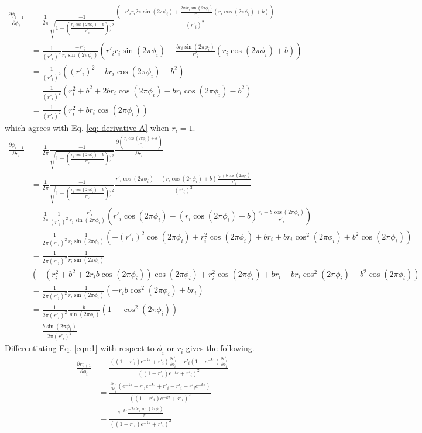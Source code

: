 \begin{align*}
   \frac{\partial \phi_{i+1}}{\partial \phi_i} & = \frac{1}{2\pi}\frac{-1}{\sqrt{1-(\frac{r_i\cos(2\pi\phi_i)+b}{r'_i}))^2}}  \frac{(-r'_ir_i2\pi\sin(2\pi\phi_i)+\frac{2\pi br_i\sin(2\pi\phi_i)}{r'_i}(r_i\cos(2\pi\phi_i)+b))}{(r'_i)^2}\\
   & = \frac{1}{(r'_i)^2}\frac{-r'_i}{r_i\sin(2\pi\phi_i)}   (r'_ir_i\sin(2\pi\phi_i)-\frac{br_i\sin(2\pi\phi_i)}{r'_i}(r_i\cos(2\pi\phi_i)+b))\\
   & = \frac{1}{(r'_i)^2}((r'_i)^2-br_i\cos(2\pi\phi_i)-b^2)\\
   & = \frac{1}{(r'_i)^2}(r_i^2+b^2+2br_i\cos(2\pi\phi_i)-br_i\cos(2\pi\phi_i)-b^2)\\
   & = \frac{1}{(r'_i)^2}(r_i^2+br_i\cos(2\pi\phi_i))
\end{align*}
which agrees with Eq. \ref{eq: derivative A} when $r_i=1$.
\begin{align*}
   \frac{\partial \phi_{i+1}}{\partial r_i} & = \frac{1}{2\pi}\frac{-1}{\sqrt{1-(\frac{r_i\cos(2\pi\phi_i)+b}{r'_i}))^2}}\frac{\partial (\frac{r_i\cos(2\pi\phi_i)+b}{r'_i})}{\partial r_i}\\
   & = \frac{1}{2\pi}\frac{-1}{\sqrt{1-(\frac{r_i\cos(2\pi\phi_i)+b}{r'_i}))^2}}\frac{r'_i\cos(2\pi\phi_i)-(r_i\cos(2\pi\phi_i)+b)\frac{r_i+b\cos(2\pi\phi_i)}{r'_i}}{(r'_i)^2}\\
   & = \frac{1}{2\pi}\frac{1}{(r'_i)^2}\frac{-r'_i}{r_i\sin(2\pi\phi_i)}(r'_i\cos(2\pi\phi_i)-(r_i\cos(2\pi\phi_i)+b)\frac{r_i+b\cos(2\pi\phi_i)}{r'_i})\\
   & = \frac{1}{2\pi(r'_i)^2} \frac{1}{r_i\sin(2\pi\phi_i)}(-(r'_i)^2\cos(2\pi\phi_i)+r_i^2\cos(2\pi\phi_i)+br_i+br_i\cos^2(2\pi\phi_i)+b^2\cos(2\pi\phi_i))\\
   & = \frac{1}{2\pi(r'_i)^2} \frac{1}{r_i\sin(2\pi\phi_i)}\\
   &(-(r^2_i+b^2+2r_ib\cos(2\pi\phi_i))\cos(2\pi\phi_i)+r^2_i\cos(2\pi\phi_i)+br_i+br_i\cos^2(2\pi\phi_i)+b^2\cos(2\pi\phi_i))\\
   & = \frac{1}{2\pi(r'_i)^2} \frac{1}{r_i\sin(2\pi\phi_i)}(-r_ib\cos^2(2\pi\phi_i)+br_i)\\
   & = \frac{1}{2\pi(r'_i)^2} \frac{b}{\sin(2\pi\phi_i)}(1-\cos^2(2\pi\phi_i))\\
   & = \frac{b\sin(2\pi\phi_i)}{2\pi(r'_i)^2}
\end{align*} 
Differentiating Eq. \ref{eqn:1} with respect to $\phi_i$ or $r_i$ gives the following.
\begin{align*}
   \frac{\partial r_{i+1}}{\partial \phi_i} & = \frac{((1-r'_i)e^{-k\tau}+r'_i)\frac{\partial r'_i}{\partial \phi_i}-r'_i(1-e^{-k\tau})\frac{\partial r'_i}{\partial \phi_i}}{((1-r'_i)e^{-k\tau}+r'_i)^2}\\
    & = \frac{\frac{\partial r'_i}{\partial \phi_i}(e^{-k\tau}-r'_ie^{-k\tau}+r'_i-r'_i+r'_ie^{-k\tau})}{((1-r'_i)e^{-k\tau}+r'_i)^2}\\
    & = \frac{e^{-k\tau}\frac{-2\pi br_i \sin(2\pi\phi_i)}{r'_i}}{((1-r'_i)e^{-k\tau}+r'_i)^2}
\end{align*} 

